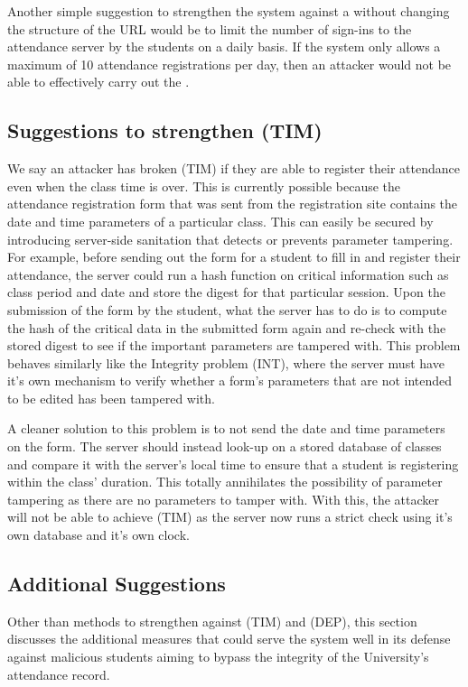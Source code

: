 \documentclass[runningheads]{llncs}
\begin{document}
Another simple suggestion to strengthen the system against a \scanattack{} without changing the structure of the URL would be to limit the number of sign-ins to the attendance server by the students on a daily basis. If the system only allows a maximum of 10 attendance registrations per day, then an attacker would not be able to effectively carry out the \scanattack{}.

\subsection{Suggestions to strengthen (TIM)}
We say an attacker has broken (TIM) if they are able to register their attendance even when the class time is over. This is currently possible because the attendance registration form that was sent from the registration site contains the date and time parameters of a particular class. This can easily be secured by introducing server-side sanitation that detects or prevents parameter tampering. For example, before sending out the form for a student to fill in and register their attendance, the server could run a hash function on critical information such as class period and date and store the digest for that particular session. Upon the submission of the form by the student, what the server has to do is to compute the hash of the critical data in the submitted form again and re-check with the stored digest to see if the important parameters are tampered with. This problem behaves similarly like the Integrity problem (INT), where the server must have it's own mechanism to verify whether a form's parameters that are not intended to be edited has been tampered with.

A cleaner solution to this problem is to not send the date and time parameters on the form. The server should instead look-up on a stored database of classes and compare it with the server's local time to ensure that a student is registering within the class' duration. This totally annihilates the possibility of parameter tampering as there are no parameters to tamper with. With this, the attacker will not be able to achieve (TIM) as the server now runs a strict check using it's own database and it's own clock.

\subsection{Additional Suggestions}
Other than methods to strengthen against (TIM) and (DEP), this section discusses the additional measures that could serve the system well in its defense against malicious students aiming to bypass the integrity of the University's attendance record. 
\end{document}
